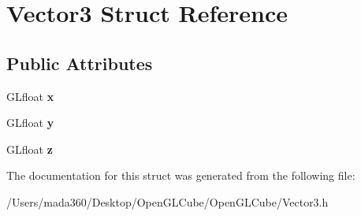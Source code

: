 \hypertarget{struct_vector3}{}\section{Vector3 Struct Reference}
\label{struct_vector3}
\subsection*{Public Attributes}
\begin{DoxyCompactItemize}
\item 
\hypertarget{struct_vector3_a6ec3f95e5fb0ee725d5fbdb8f17cebf6}{}G\+Lfloat {\bfseries x}\label{struct_vector3_a6ec3f95e5fb0ee725d5fbdb8f17cebf6}

\item 
\hypertarget{struct_vector3_a0e05f1adf7616989f7f89fed6cb4e873}{}G\+Lfloat {\bfseries y}\label{struct_vector3_a0e05f1adf7616989f7f89fed6cb4e873}

\item 
\hypertarget{struct_vector3_a062291c1bffe3f872c3fe6eda01f897e}{}G\+Lfloat {\bfseries z}\label{struct_vector3_a062291c1bffe3f872c3fe6eda01f897e}

\end{DoxyCompactItemize}


The documentation for this struct was generated from the following file\+:\begin{DoxyCompactItemize}
\item 
/\+Users/mada360/\+Desktop/\+Open\+G\+L\+Cube/\+Open\+G\+L\+Cube/Vector3.\+h\end{DoxyCompactItemize}
